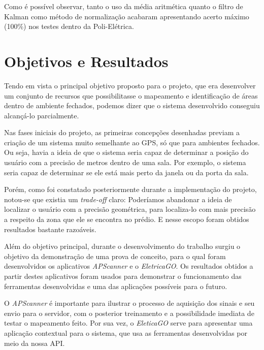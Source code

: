 Como é possível observar, tanto o uso da média aritmética quanto o filtro de Kalman como método de normalização acabaram apresentando acerto máximo (100\%) nos testes dentro da Poli-Elétrica.


\section{Objetivos e Resultados}
Tendo em vista o principal objetivo proposto para o projeto, que era desenvolver um conjunto de recursos que possibilitasse o mapeamento e identificação de áreas dentro de ambiente fechados, podemos dizer que o sistema desenvolvido conseguiu alcançá-lo parcialmente.\par
Nas fases iniciais do projeto, as primeiras concepções desenhadas previam a criação de um sistema muito semelhante ao GPS, só que para ambientes fechados. Ou seja, havia a ideia de que o sistema seria capaz de determinar a posição do usuário com a precisão de metros dentro de uma sala. Por exemplo, o sistema seria capaz de determinar se ele está mais perto da janela ou da porta da sala.\par
Porém, como foi constatado posteriormente durante a implementação do projeto, notou-se que existia um \textit{trade-off} claro: Poderíamos abandonar a ideia de localizar o usuário com a precisão geométrica, para localiza-lo com mais precisão a respeito da zona que ele se encontra no prédio. E nesse escopo foram obtidos resultados bastante razoáveis.\par
Além do objetivo principal, durante o desenvolvimento do trabalho surgiu o objetivo da demonstração de uma prova de conceito, para o qual foram desenvolvidos os aplicativos \textit{APScanner} e o \textit{EletricaGO}. Os resultados obtidos a partir destes aplicativos foram usados para demonstrar o funcionamento das ferramentas desenvolvidas e uma das aplicações possíveis para o futuro.\par
O \textit{APScanner} é importante para ilustrar o processo de aquisição dos sinais e seu envio para o servidor, com o posterior treinamento e a possibilidade imediata de testar o mapeamento feito. Por sua vez, o \textit{EleticaGO} serve para apresentar uma aplicação contextual para o sistema, que usa as ferramentas desenvolvidas por meio da nossa API. \par



